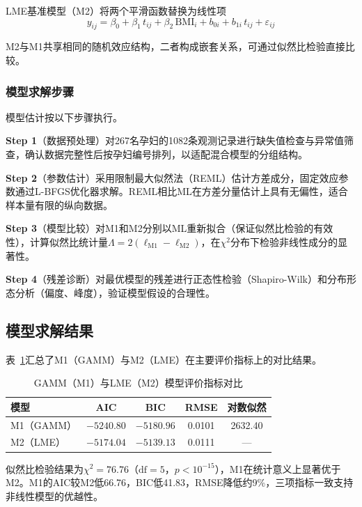 \documentclass[withoutpreface]{cumcmthesis}
\begin{document}
LME基准模型（M2）将两个平滑函数替换为线性项
\begin{equation}\label{eq:lme}
  y_{ij} = \beta_0 + \beta_1\,t_{ij} + \beta_2\,\mathrm{BMI}_i + b_{0i} + b_{1i}\,t_{ij} + \varepsilon_{ij}
\end{equation}

M2与M1共享相同的随机效应结构，二者构成嵌套关系，可通过似然比检验直接比较。

\subsubsection{模型求解步骤}

模型估计按以下步骤执行。

\textbf{Step 1}（数据预处理）\quad 对267名孕妇的1082条观测记录进行缺失值检查与异常值筛查，确认数据完整性后按孕妇编号排列，以适配混合模型的分组结构。

\textbf{Step 2}（参数估计）\quad 采用限制最大似然法（REML）估计方差成分，固定效应参数通过L-BFGS优化器求解。REML相比ML在方差分量估计上具有无偏性，适合样本量有限的纵向数据。

\textbf{Step 3}（模型比较）\quad 对M1和M2分别以ML重新拟合（保证似然比检验的有效性），计算似然比统计量$\Lambda = 2(\ell_{\mathrm{M1}} - \ell_{\mathrm{M2}})$，在$\chi^2$分布下检验非线性成分的显著性。

\textbf{Step 4}（残差诊断）\quad 对最优模型的残差进行正态性检验（Shapiro-Wilk）和分布形态分析（偏度、峰度），验证模型假设的合理性。

\subsection{模型求解结果}

表~\ref{tab:q1-compare}汇总了M1（GAMM）与M2（LME）在主要评价指标上的对比结果。

\begin{table}[H]
  \centering
  \caption{GAMM（M1）与LME（M2）模型评价指标对比}\label{tab:q1-compare}
  \begin{tabular}{lcccc}
    \toprule
    模型 & AIC & BIC & RMSE & 对数似然 \\
    \midrule
    M1（GAMM） & $-5240.80$ & $-5180.96$ & 0.0101 & 2632.40 \\
    M2（LME）  & $-5174.04$ & $-5139.13$ & 0.0111 & --- \\
    \bottomrule
  \end{tabular}
\end{table}

似然比检验结果为$\chi^2=76.76$（$\mathrm{df}=5$，$p<10^{-15}$），M1在统计意义上显著优于M2。M1的AIC较M2低66.76，BIC低41.83，RMSE降低约9\%，三项指标一致支持非线性模型的优越性。
\end{document}
